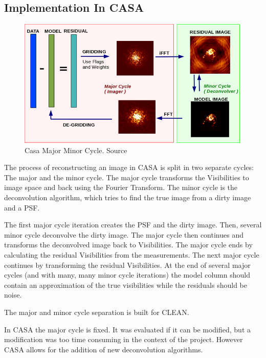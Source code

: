 \subsection{Implementation In CASA}

\begin{figure}
	\centering
	\vspace{-15pt}
	\includegraphics[width=0.9\linewidth]{./chapters/04.cs/img/casa_major_minor.png}
	\caption{Casa Major Minor Cycle. Source \cite{casa2018major}}
	\label{cs:major}
	\vspace{-10pt}
\end{figure}

The process of reconstructing an image in CASA is split in two separate cycles: The major and the minor cycle. The major cycle transforms the Visibilities to image space and back using the Fourier Transform. The minor cycle is the deconvolution algorithm, which tries to find the true image from a dirty image and a PSF. 

The first major cycle iteration creates the PSF and the dirty image. Then, several minor cycle deconvolve the dirty image. The major cycle then continues and transforms the deconvolved image back to Visibilities. The major cycle ends by calculating the residual Visibilities from the measurements. The next major cycle continues by transforming the residual Visibilities. At the end of several major cycles (and with many, many minor cycle iterations) the model column should contain an approximation of the true visibilities while the residuals should be noise. 


The major and minor cycle separation is built for CLEAN.


In CASA the major cycle is fixed. It was evaluated if it can be modified, but a modification was too time consuming in the context of the project. However CASA allows for the addition of new deconvolution algorithms. 

